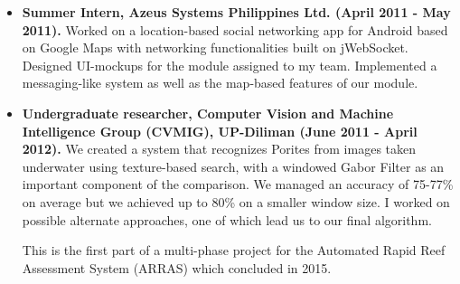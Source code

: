 \documentclass{article}
\begin{document}
\begin{itemize}

      \item \textbf{Summer Intern, Azeus Systems Philippines Ltd. (April 2011 - May 2011).} Worked on a
      location-based social networking app for Android based on Google Maps with networking functionalities built
      on jWebSocket. Designed UI-mockups for the module assigned to my team. Implemented a
      messaging-like system as well as the map-based features of our module.

   \end{itemize}

    \begin{itemize}
      \item \textbf{Undergraduate researcher, Computer Vision and Machine Intelligence Group (CVMIG), UP-Diliman
      (June 2011 - April 2012).} We created a system that recognizes Porites from images taken
      underwater using texture-based search, with a windowed Gabor Filter as an important component
      of the comparison. We managed an accuracy of 75-77\% on average but we achieved up to 80\% on a smaller
      window size. I worked on possible alternate approaches, one of which lead us to our final algorithm.

      This is the first part of a multi-phase project for the Automated Rapid Reef Assessment System (ARRAS) which
      concluded in 2015.

    \end{itemize}
\end{document}
